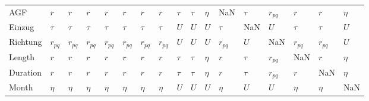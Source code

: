\begin{tabular}{lllllllllllllllll}
AGF      &       $r$ &       $r$ &       $r$ &       $r$ &       $r$ &       $r$ &       $r$ &  $\tau$ &  $\tau$ &  $\eta$ &       NaN &  $\tau$ &  $r_{pq}$ &       $r$ &       $r$ &  $\eta$ \\
Einzug   &    $\tau$ &    $\tau$ &    $\tau$ &    $\tau$ &    $\tau$ &    $\tau$ &    $\tau$ &     $U$ &     $U$ &     $U$ &    $\tau$ &     NaN &       $U$ &    $\tau$ &    $\tau$ &     $U$ \\
Richtung &  $r_{pq}$ &  $r_{pq}$ &  $r_{pq}$ &  $r_{pq}$ &  $r_{pq}$ &  $r_{pq}$ &  $r_{pq}$ &     $U$ &     $U$ &     $U$ &  $r_{pq}$ &     $U$ &       NaN &  $r_{pq}$ &  $r_{pq}$ &     $U$ \\
Length   &       $r$ &       $r$ &       $r$ &       $r$ &       $r$ &       $r$ &       $r$ &  $\tau$ &  $\tau$ &  $\eta$ &       $r$ &  $\tau$ &  $r_{pq}$ &       NaN &       $r$ &  $\eta$ \\
Duration &       $r$ &       $r$ &       $r$ &       $r$ &       $r$ &       $r$ &       $r$ &  $\tau$ &  $\tau$ &  $\eta$ &       $r$ &  $\tau$ &  $r_{pq}$ &       $r$ &       NaN &  $\eta$ \\
Month    &    $\eta$ &    $\eta$ &    $\eta$ &    $\eta$ &    $\eta$ &    $\eta$ &    $\eta$ &     $U$ &     $U$ &     $U$ &    $\eta$ &     $U$ &       $U$ &    $\eta$ &    $\eta$ &     NaN \\
\bottomrule
\end{tabular}
